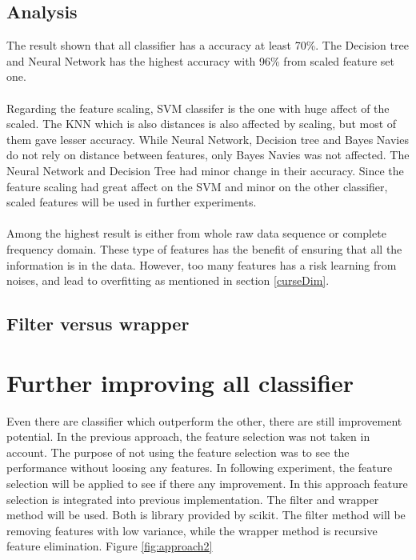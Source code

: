 \documentclass[USenglish]{ifimaster}  %
\begin{document}
	\FloatBarrier
	
	
	\subsection{Analysis}
	The result shown that all classifier has a accuracy at least 70\%. The Decision tree and Neural Network has the highest accuracy with 96\% from scaled feature set one. 
	\\
	\\
	Regarding the feature scaling, SVM classifer is the one with huge affect of the scaled. The KNN which is also distances is also affected by scaling, but most of them gave lesser accuracy. While Neural Network, Decision tree and Bayes Navies do not rely on distance between features, only Bayes Navies was not affected. The Neural Network and Decision Tree had minor change in their accuracy. Since the feature scaling had great affect on the SVM and minor on the other classifier, scaled features will be used in further experiments.
	\\
	\\
	Among the highest result is either from whole raw data sequence or complete frequency domain. These type of features has the benefit of ensuring that all the information is in the data. However, too many features has a risk learning from noises, and lead to overfitting as mentioned in section \ref{curseDim}.
	
	\subsection{Filter versus wrapper}
	
	
	
	
	
	
	\section{Further improving all classifier}
	Even there are classifier which outperform the other, there are still improvement potential. In the previous approach, the feature selection was not taken in account. The purpose of not using the feature selection was to see the performance without loosing any features. In following experiment, the feature selection will be applied to see if there any improvement.  In this approach feature selection is integrated into previous implementation. The filter and wrapper method will be used. Both is library provided by scikit. The filter method will be removing features with low variance, while the wrapper method is recursive feature elimination. Figure \ref{fig:approach2}
	
\end{document}
